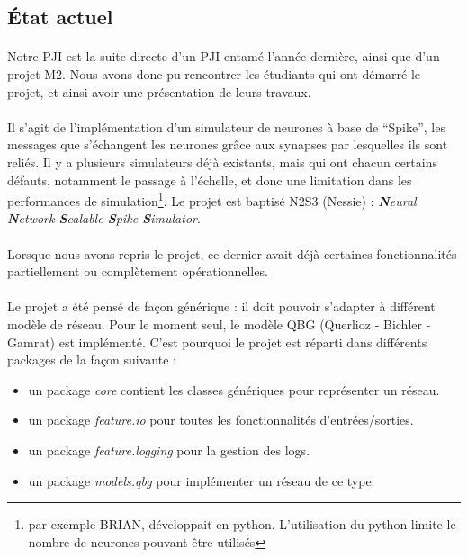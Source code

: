 \documentclass[a4paper,10pt]{article}
\begin{document}
\newpage

\subsection{État actuel}

\paragraph{}
Notre PJI est la suite directe d’un PJI entamé l’année dernière, ainsi que d’un projet M2. Nous avons donc pu rencontrer les étudiants qui ont démarré le projet, et ainsi avoir une présentation de leurs travaux.

\paragraph{}
Il s’agit de l’implémentation d’un simulateur de neurones à base de “Spike”, les messages que s’échangent les neurones grâce aux synapses par lesquelles ils sont reliés. Il y a plusieurs simulateurs déjà existants, mais qui  ont chacun certains défauts, notamment le passage à l’échelle, et donc une limitation dans les performances de simulation\footnote{par exemple BRIAN, développait en python. L'utilisation du python limite le nombre de neurones pouvant être utilisés}. Le projet est baptisé N2S3 (Nessie) : \emph{\textbf{N}eural \textbf{N}etwork \textbf{S}calable
\textbf{S}pike \textbf{S}imulator}.

\paragraph{}
Lorsque nous avons repris le projet, ce dernier avait déjà certaines fonctionnalités partiellement ou complètement opérationnelles.

\paragraph{}
Le projet a été pensé de façon générique : il doit pouvoir s’adapter à différent modèle de réseau. Pour le moment seul, le modèle QBG (Querlioz - Bichler - Gamrat) est implémenté. C’est pourquoi le projet est réparti dans différents packages de la façon suivante :

\begin{itemize}
	\item un package \emph{core} contient les classes génériques pour représenter un réseau.
	\item un package \emph{feature.io} pour toutes les fonctionnalités d’entrées/sorties.
	\item un package \emph{feature.logging} pour la gestion des logs.
	\item un package \emph{models.qbg} pour implémenter un réseau de ce type.
\end{itemize}
\end{document}
